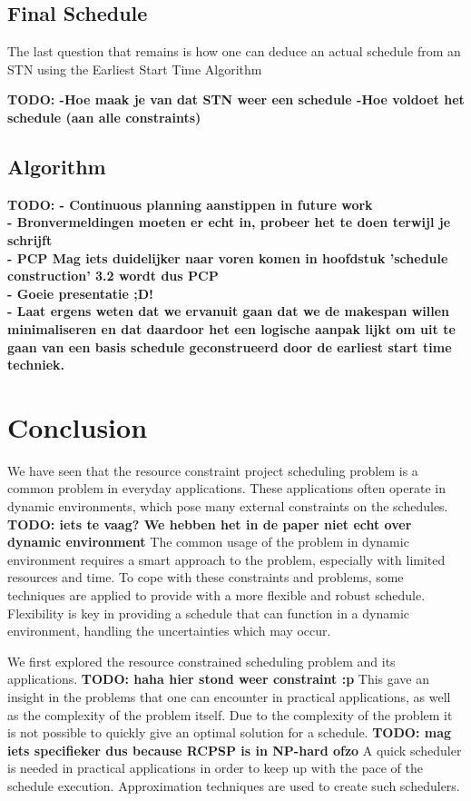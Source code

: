 \documentclass{article}
\theoremstyle{definition}
\newcommand{\TODO}[1]{{\color{red}\textbf{TODO: #1}}}
\begin{document}
\subsection{Final Schedule}
The last question that remains is how one can deduce an actual schedule from an STN using the Earliest Start Time Algorithm


\TODO{
		-Hoe maak je van dat STN weer een schedule
		-Hoe voldoet het schedule (aan alle constraints)
}

\subsection{Algorithm}

\newpage

\TODO{
 - Continuous planning aanstippen in future work \\
 - Bronvermeldingen moeten er echt in, probeer het te doen terwijl je schrijft \\
 - PCP Mag iets duidelijker naar voren komen in hoofdstuk 'schedule construction' 3.2 wordt dus PCP \\
 - Goeie presentatie ;D! \\
 - Laat ergens weten dat we ervanuit gaan dat we de makespan willen minimaliseren en dat daardoor het een logische aanpak lijkt om uit te gaan van een basis schedule geconstrueerd door de earliest start time techniek. \\
 }

\newpage
 
\section{Conclusion}

We have seen that the resource constraint project scheduling problem is a common problem in everyday applications.
These applications often operate in dynamic environments, which pose many external constraints on the schedules.
\TODO{iets te vaag? We hebben het in de paper niet echt over dynamic environment}
The common usage of the problem in dynamic environment requires a smart approach to the problem, especially with limited resources and time.
To cope with these constraints and problems, some techniques are applied to provide with a more flexible and robust schedule.
Flexibility is key in providing a schedule that can function in a dynamic environment, handling the uncertainties which may occur.

We first explored the resource constrained scheduling problem and its applications. \TODO{haha hier stond weer constraint :p}
This gave an insight in the problems that one can encounter in practical applications, as well as the complexity of the problem itself.
Due to the complexity of the problem it is not possible to quickly give an optimal solution for a schedule. \TODO{mag iets specifieker dus because RCPSP is in NP-hard ofzo}
A quick scheduler is needed in practical applications in order to keep up with the pace of the schedule execution. 
Approximation techniques are used to create such schedulers.
\end{document}
